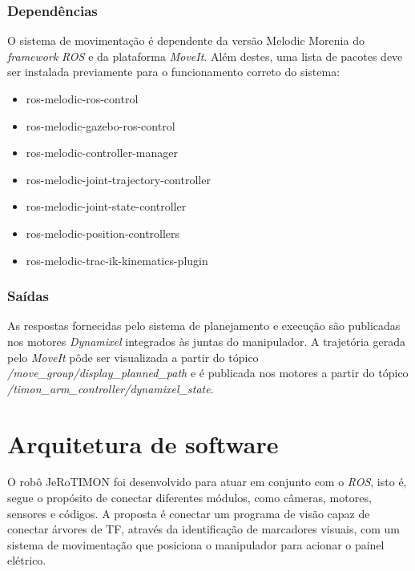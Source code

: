 \subsubsection{Dependências}
\label{ssub:depB}
O sistema de movimentação é dependente da versão Melodic Morenia do \textit{framework} \textit{\acs{ROS}} e da plataforma \textit{MoveIt}. Além destes, uma lista de pacotes deve ser instalada previamente para o funcionamento correto do sistema:

    \begin{itemize}
      \item ros-melodic-ros-control
      \item ros-melodic-gazebo-ros-control
      \item ros-melodic-controller-manager
      \item ros-melodic-joint-trajectory-controller
      \item ros-melodic-joint-state-controller
      \item ros-melodic-position-controllers
      \item ros-melodic-trac-ik-kinematics-plugin
    \end{itemize}

\subsubsection{Saídas}
\label{ssub:saidaB}
As respostas fornecidas pelo sistema de planejamento e execução são publicadas nos  motores \textit{Dynamixel} integrados às juntas do manipulador. A trajetória gerada pelo \textit{MoveIt} pôde ser visualizada a partir do tópico \textit{/move\_group/display\_planned\_path} e é publicada nos motores a partir do tópico \textit{/timon\_arm\_controller/dynamixel\_state}.


\section{Arquitetura de software}
\label{sec:arqs}
O robô JeRoTIMON foi desenvolvido para atuar em conjunto com o \textit{\acs{ROS}}, isto é, segue o propósito de conectar diferentes módulos, como câmeras, motores, sensores e códigos. A proposta é conectar um programa de visão capaz de conectar árvores de TF, através da identificação de marcadores visuais, com um sistema de movimentação que posiciona o manipulador para acionar o painel elétrico.

